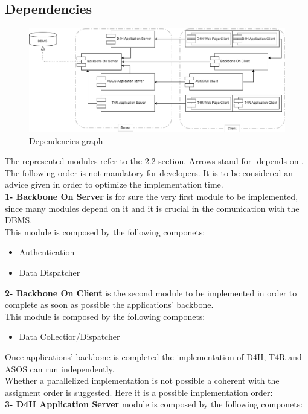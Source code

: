 \subsection{Dependencies}
\begin{figure}[H]
\caption{Dependencies graph}
\includegraphics[width = \textwidth]{sections/implementationIntegrationTestGraphs/DependenciesGraph.png}
\end{figure}
The represented modules refer to the 2.2 section. Arrows stand for -depends on-.\\
The following order is not mandatory for developers. It is to be considered an advice given in order to optimize the implementation time.\\
\textbf{1- Backbone On Server} is for sure the very first module to be implemented, since many modules depend on it and it is crucial in the comunication with the DBMS.\\ This module is composed by the following componets:
\begin{itemize}
\item Authentication
\item Data Dispatcher
\end{itemize}
 \textbf{2- Backbone On Client} is the second module to be implemented in order to complete as soon as possible the applications' backbone.\\ This module is composed by the following componets:
\begin{itemize}
\item Data Collectior/Dispatcher
\end{itemize}
Once applications' backbone is completed the implementation of D4H, T4R and ASOS can run independently.\\ Whether a parallelized implementation is not possible a coherent with the assigment order is suggested. Here it is a possible implementation order:\\
 \textbf{3- D4H Application Server} module is composed by the following componets:
